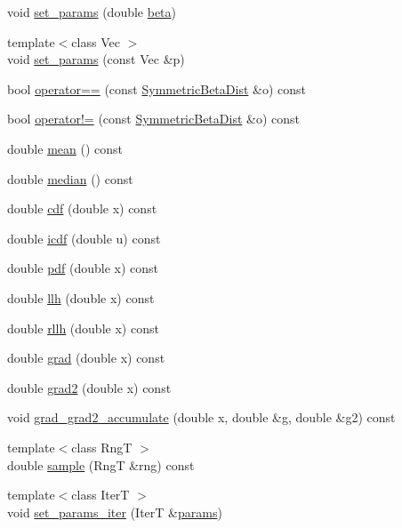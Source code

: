 \begin{DoxyCompactItemize}
void \hyperlink{classprior__hessian_1_1SymmetricBetaDist_a8f54c616932761272dad23e3da2be005}{set\+\_\+params} (double \hyperlink{classprior__hessian_1_1SymmetricBetaDist_a1e726eb12d98240778d7c0bfaafc7edd}{beta})
\item 
{\footnotesize template$<$class Vec $>$ }\\void \hyperlink{classprior__hessian_1_1SymmetricBetaDist_a1f774edc4e8701e8410559a3ff90c193}{set\+\_\+params} (const Vec \&p)
\item 
bool \hyperlink{classprior__hessian_1_1SymmetricBetaDist_ad4d4bd09ccdf88bb70a66064fc3a9a9d}{operator==} (const \hyperlink{classprior__hessian_1_1SymmetricBetaDist}{Symmetric\+Beta\+Dist} \&o) const 
\item 
bool \hyperlink{classprior__hessian_1_1SymmetricBetaDist_afdc7ff36dab9f6a2de9f53f12ca87973}{operator!=} (const \hyperlink{classprior__hessian_1_1SymmetricBetaDist}{Symmetric\+Beta\+Dist} \&o) const 
\item 
double \hyperlink{classprior__hessian_1_1SymmetricBetaDist_a9b6ecbdfd6656dd19d3d066a726d8db6}{mean} () const 
\item 
double \hyperlink{classprior__hessian_1_1SymmetricBetaDist_a642a881868f0f031bacc87877714cf8d}{median} () const 
\item 
double \hyperlink{classprior__hessian_1_1SymmetricBetaDist_af1ec7c9d55329f63a44807752e74d746}{cdf} (double x) const 
\item 
double \hyperlink{classprior__hessian_1_1SymmetricBetaDist_a541de90660b38fe706b8656ea10b3db5}{icdf} (double u) const 
\item 
double \hyperlink{classprior__hessian_1_1SymmetricBetaDist_a6eb4a96ac9d8b7662ca5479da4c632d3}{pdf} (double x) const 
\item 
double \hyperlink{classprior__hessian_1_1SymmetricBetaDist_a705d0521091fc93418588af78d85cc52}{llh} (double x) const 
\item 
double \hyperlink{classprior__hessian_1_1SymmetricBetaDist_aaeb20e0c35223789304c4de29aa0461b}{rllh} (double x) const 
\item 
double \hyperlink{classprior__hessian_1_1SymmetricBetaDist_a039bcc1dfc99119dc5acf535a5369edc}{grad} (double x) const 
\item 
double \hyperlink{classprior__hessian_1_1SymmetricBetaDist_a66a2fb38407bc9592fd30eaceb6581b6}{grad2} (double x) const 
\item 
void \hyperlink{classprior__hessian_1_1SymmetricBetaDist_a7a5be166cc094953083b8bcbdf239be3}{grad\+\_\+grad2\+\_\+accumulate} (double x, double \&g, double \&g2) const 
\item 
{\footnotesize template$<$class RngT $>$ }\\double \hyperlink{classprior__hessian_1_1SymmetricBetaDist_a85c544524b8b02e31d5394289b227a4c}{sample} (RngT \&rng) const 
\item 
{\footnotesize template$<$class IterT $>$ }\\void \hyperlink{classprior__hessian_1_1SymmetricBetaDist_a50df68faf7f3205ddc19b0664593cdb8}{set\+\_\+params\+\_\+iter} (IterT \&\hyperlink{classprior__hessian_1_1SymmetricBetaDist_a2db7bdb8013ac523f58d2b252ea0dbb4}{params})
\end{DoxyCompactItemize}
